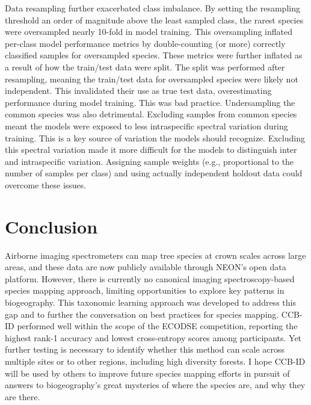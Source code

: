 Data resampling further exacerbated class imbalance. By setting the resampling threshold an order of magnitude above the least sampled class, the rarest species were oversampled nearly 10-fold in model training. This oversampling inflated per-class model performance metrics by double-counting (or more) correctly classified samples for oversampled species. These metrics were further inflated as a result of how the train/test data were split. The split was performed after resampling, meaning the train/test data for oversampled species were likely not independent. This invalidated their use as true test data, overestimating performance during model training. This was bad practice. Undersampling the common species was also detrimental. Excluding samples from common species meant the models were exposed to less intraspecific spectral variation during training. This is a key source of variation the models should recognize. Excluding this spectral variation made it more difficult for the models to distinguish inter and intraspecific variation. Assigning sample weights (e.g., proportional to the number of samples per class) and using actually independent holdout data could overcome these issues. 

\section{Conclusion}

Airborne imaging spectrometers can map tree species at crown scales across large areas, and these data are now publicly available through NEON's open data platform. However, there is currently no canonical imaging spectroscopy-based species mapping approach, limiting opportunities to explore key patterns in biogeography. This taxonomic learning approach was developed to address this gap and to further the conversation on best practices for species mapping. CCB-ID performed well within the scope of the ECODSE competition, reporting the highest rank-1 accuracy and lowest cross-entropy scores among participants. Yet further testing is necessary to identify whether this method can scale across multiple sites or to other regions, including high diversity forests. I hope CCB-ID will be used by others to improve future species mapping efforts in pursuit of answers to biogeography’s great mysteries of where the species are, and why they are there.

\clearpage